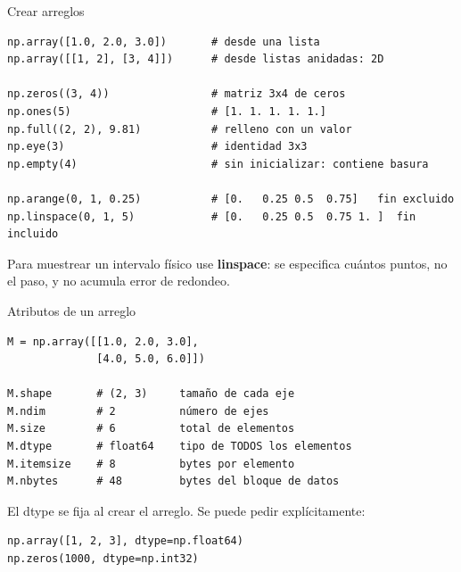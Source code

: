 \documentclass[aspectratio=169, 11pt]{beamer}
\newcommand{\code}[1]{{\ttfamily\small\color{textoOscuro}#1}}
\begin{document}
\begin{frame}[fragile]{Crear arreglos}
\begin{lstlisting}
np.array([1.0, 2.0, 3.0])       # desde una lista
np.array([[1, 2], [3, 4]])      # desde listas anidadas: 2D

np.zeros((3, 4))                # matriz 3x4 de ceros
np.ones(5)                      # [1. 1. 1. 1. 1.]
np.full((2, 2), 9.81)           # relleno con un valor
np.eye(3)                       # identidad 3x3
np.empty(4)                     # sin inicializar: contiene basura

np.arange(0, 1, 0.25)           # [0.   0.25 0.5  0.75]   fin excluido
np.linspace(0, 1, 5)            # [0.   0.25 0.5  0.75 1. ]  fin incluido
\end{lstlisting}

Para muestrear un intervalo físico use \textbf{\code{linspace}}: se
especifica cuántos puntos, no el paso, y no acumula error de redondeo.
\end{frame}

\begin{frame}[fragile]{Atributos de un arreglo}
\begin{lstlisting}
M = np.array([[1.0, 2.0, 3.0],
              [4.0, 5.0, 6.0]])

M.shape       # (2, 3)     tamaño de cada eje
M.ndim        # 2          número de ejes
M.size        # 6          total de elementos
M.dtype       # float64    tipo de TODOS los elementos
M.itemsize    # 8          bytes por elemento
M.nbytes      # 48         bytes del bloque de datos
\end{lstlisting}

El \code{dtype} se fija al crear el arreglo. Se puede pedir
explícitamente:

\begin{lstlisting}
np.array([1, 2, 3], dtype=np.float64)
np.zeros(1000, dtype=np.int32)
\end{lstlisting}
\end{frame}
\end{document}
